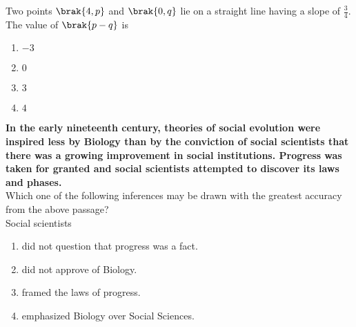     \item Two points $\brak{4, p}$ and $\brak{0, q}$ lie on a straight line having a slope of $\frac{3}{4}$. The value of $\brak{p - q}$ is
    \begin{enumerate}
        \item $-3$
        \item $0$
        \item $3$
        \item $4$
    \end{enumerate}

    \item \textbf{In the early nineteenth century, theories of social evolution were inspired less by Biology than by the conviction of social scientists that there was a growing improvement in social institutions. Progress was taken for granted and social scientists attempted to discover its laws and phases.} \\
    Which one of the following inferences may be drawn with the greatest accuracy from the above passage? \\
    Social scientists
    \begin{enumerate}
        \item did not question that progress was a fact.
        \item did not approve of Biology.
        \item framed the laws of progress.
        \item emphasized Biology over Social Sciences.
    \end{enumerate}



 
